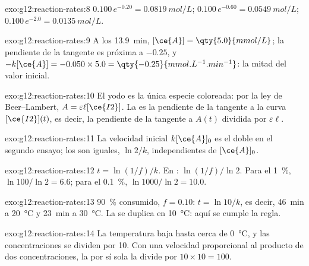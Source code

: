 \begin{solution}{exo:g12:reaction-rates:8}
$0.100\,e^{-0.20} = \qty{0.0819}{mol/L}$; $0.100\,e^{-0.60} =
\qty{0.0549}{mol/L}$; $0.100\,e^{-2.0} = \qty{0.0135}{mol/L}$.
\end{solution}

\begin{solution}{exo:g12:reaction-rates:9}
A los \qty{13.9}{min}, $[\ce{A}] = \qty{5.0}{mmol/L}$; la pendiente de la
tangente es próxima a $-0.25$, y $-k[\ce{A}] = -0.050 \times 5.0 =
\qty{-0.25}{mmol.L^{-1}.min^{-1}}$: la mitad del valor inicial.
\end{solution}

\begin{solution}{exo:g12:reaction-rates:10}
El yodo es la única especie coloreada: por la ley de Beer--Lambert,
$A = \varepsilon \ell [\ce{I2}]$. La  es la
pendiente de la tangente a la curva $[\ce{I2}](t)$, es decir, la
pendiente de la tangente a $A(t)$ dividida por $\varepsilon \ell$.
\end{solution}

\begin{solution}{exo:g12:reaction-rates:11}
La velocidad inicial $k[\ce{A}]_0$ es el doble en el segundo ensayo; los
 son iguales, $\ln 2 / k$, independientes de
$[\ce{A}]_0$.
\end{solution}

\begin{solution}{exo:g12:reaction-rates:12}
$t = \ln(1/f)/k$. En : $\ln(1/f)/\ln 2$. Para el
\qty{1}{\percent}, $\ln 100 / \ln 2 = 6.6$; para el \qty{0.1}{\percent},
$\ln 1000 / \ln 2 =
10.0$.
\end{solution}

\begin{solution}{exo:g12:reaction-rates:13}
\qty{90}{\percent} consumido, $f = 0.10$: $t = \ln 10 / k$, es decir,
\qty{46}{min} a \qty{20}{\celsius} y \qty{23}{min} a \qty{30}{\celsius}.
La  se duplica en \qty{10}{\celsius}: aquí se
cumple la regla.
\end{solution}

\begin{solution}{exo:g12:reaction-rates:14}
La temperatura baja hasta cerca de \qty{0}{\celsius}, y las
concentraciones se dividen por 10. Con una velocidad proporcional al
producto de dos concentraciones, la  por sí sola la divide por
$10 \times 10 = 100$.
\end{solution}

